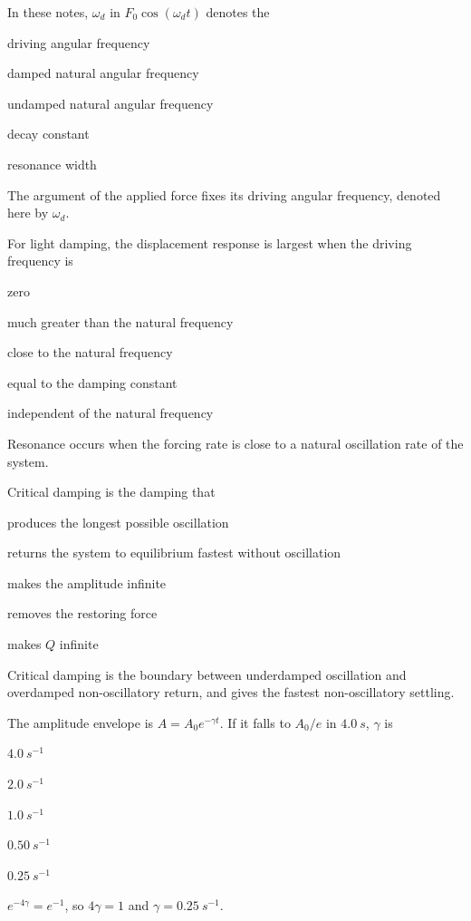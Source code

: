 \documentclass[10pt,a4paper,full]{physicsquiz}
\newcommand{\bankq}[9]{%
  \begin{quizquestion}[
    id=#1,
    topic={#2},
    difficulty=#3,
    marks=1,
    correct=#4,
    tags={#5},
    outcome={#6}
  ]
    #7
    \begin{choiceoptions}
      #8
    \end{choiceoptions}
  \end{quizquestion}
  \begin{quizsolution}
    #9
  \end{quizsolution}
}
\begin{document}
\begin{quizbank}
\bankq{damping-014}{Damping, Resonance, and Transients}{foundation}{A}{damping,frequency,notation}{Distinguish driving and damped natural frequencies.}{%
In these notes, \(\omega_d\) in \(F_0\cos(\omega_dt)\) denotes the}{%
\item driving angular frequency
\item damped natural angular frequency
\item undamped natural angular frequency
\item decay constant
\item resonance width}{%
The argument of the applied force fixes its driving angular frequency, denoted here by \(\omega_d\).}

\bankq{damping-015}{Damping, Resonance, and Transients}{foundation}{C}{resonance,concept}{Recognize the resonance condition.}{%
For light damping, the displacement response is largest when the driving frequency is}{%
\item zero
\item much greater than the natural frequency
\item close to the natural frequency
\item equal to the damping constant
\item independent of the natural frequency}{%
Resonance occurs when the forcing rate is close to a natural oscillation rate of the system.}

\bankq{damping-016}{Damping, Resonance, and Transients}{foundation}{B}{damping,critical}{Identify critical damping.}{%
Critical damping is the damping that}{%
\item produces the longest possible oscillation
\item returns the system to equilibrium fastest without oscillation
\item makes the amplitude infinite
\item removes the restoring force
\item makes \(Q\) infinite}{%
Critical damping is the boundary between underdamped oscillation and overdamped non-oscillatory return, and gives the fastest non-oscillatory settling.}

\bankq{damping-017}{Damping, Resonance, and Transients}{applied}{E}{damping,decay,numerical}{Calculate a damping decay constant.}{%
The amplitude envelope is \(A=A_0e^{-\gamma t}\). If it falls to \(A_0/e\) in \(\SI{4.0}{s}\), \(\gamma\) is}{%
\item \(\SI{4.0}{s^{-1}}\)
\item \(\SI{2.0}{s^{-1}}\)
\item \(\SI{1.0}{s^{-1}}\)
\item \(\SI{0.50}{s^{-1}}\)
\item \(\SI{0.25}{s^{-1}}\)}{%
\(e^{-4\gamma}=e^{-1}\), so \(4\gamma=1\) and \(\gamma=\SI{0.25}{s^{-1}}\).}


\end{quizbank}
\end{document}
